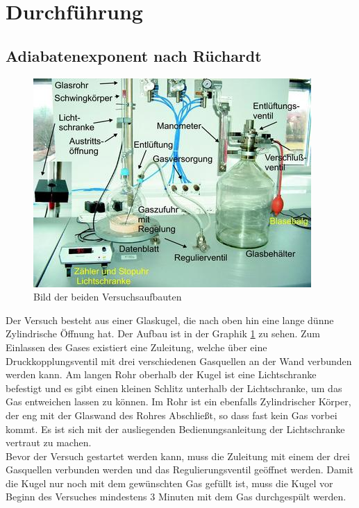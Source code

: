 \documentclass[12pt,a4paper,titlepage,headinclude,bibtotoc]{scrartcl}
\begin{document}
\section{Durchführung}
\label{sec:durchfuehrung}

\subsection{Adiabatenexponent nach Rüchardt}
\label{sec:ruech}
\begin{figure}
	\centering
	\includegraphics{3725}
	\caption{Bild der beiden Versuchsaufbauten\protect\footnotemark}\label{fig:versuch}
\end{figure}
Der Versuch besteht aus einer Glaskugel, die nach oben hin eine lange dünne Zylindrische Öffnung hat.
Der Aufbau ist in der Graphik \ref{fig:versuch}
zu sehen.
Zum Einlassen des Gases existiert eine Zuleitung, welche über eine Druckkopplungsventil mit drei verschiedenen Gasquellen an der Wand verbunden werden kann.
Am langen Rohr oberhalb der Kugel ist eine Lichtschranke befestigt und es gibt einen kleinen Schlitz unterhalb der Lichtschranke, um das Gas entweichen lassen zu können.
Im Rohr ist ein ebenfalls Zylindrischer Körper, der eng mit der Glaswand des Rohres Abschließt, so dass fast kein Gas vorbei kommt.
Es ist sich mit der ausliegenden Bedienungsanleitung der Lichtschranke vertraut zu machen.\\
Bevor der Versuch gestartet werden kann, muss die Zuleitung mit einem der drei Gasquellen verbunden werden und das Regulierungsventil geöffnet werden.
Damit die Kugel nur noch mit dem gewünschten Gas gefüllt ist, muss die Kugel vor Beginn des Versuches mindestens 3 Minuten mit dem Gas durchgespült werden.
\end{document}
